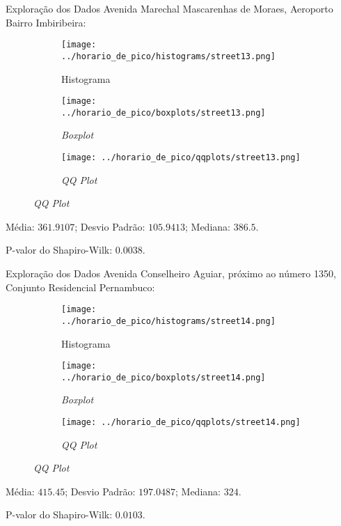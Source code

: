 \begin{frame}{Exploração dos Dados}
Avenida Marechal Mascarenhas de Moraes, Aeroporto Bairro Imbiribeira:
\begin{figure}
	\centering
	\begin{subfigure}{.33\textwidth}
		\centering
		\texttt{[image: ../horario\_de\_pico/histograms/street13.png]}
		\caption*{Histograma}
	\end{subfigure}%
	\begin{subfigure}{.33\textwidth}
		\centering
		\texttt{[image: ../horario\_de\_pico/boxplots/street13.png]}
		\caption*{\textit{Boxplot}}
	\end{subfigure}
	\begin{subfigure}{.32\textwidth}
		\centering
		\texttt{[image: ../horario\_de\_pico/qqplots/street13.png]}
		\caption*{\textit{QQ Plot}}
	\end{subfigure}
\end{figure}
Média: $361.9107$; Desvio Padrão: $105.9413$; Mediana: $386.5$.

P-valor do Shapiro-Wilk: $0.0038$.
\end{frame}

\begin{frame}{Exploração dos Dados}
Avenida Conselheiro Aguiar, próximo ao número 1350, Conjunto Residencial
Pernambuco:
\begin{figure}
	\centering
	\begin{subfigure}{.33\textwidth}
		\centering
		\texttt{[image: ../horario\_de\_pico/histograms/street14.png]}
		\caption*{Histograma}
	\end{subfigure}%
	\begin{subfigure}{.33\textwidth}
		\centering
		\texttt{[image: ../horario\_de\_pico/boxplots/street14.png]}
		\caption*{\textit{Boxplot}}
	\end{subfigure}
	\begin{subfigure}{.32\textwidth}
		\centering
		\texttt{[image: ../horario\_de\_pico/qqplots/street14.png]}
		\caption*{\textit{QQ Plot}}
	\end{subfigure}
\end{figure}
Média: $415.45$; Desvio Padrão: $197.0487$; Mediana: $324$.

P-valor do Shapiro-Wilk: $0.0103$.
\end{frame}

